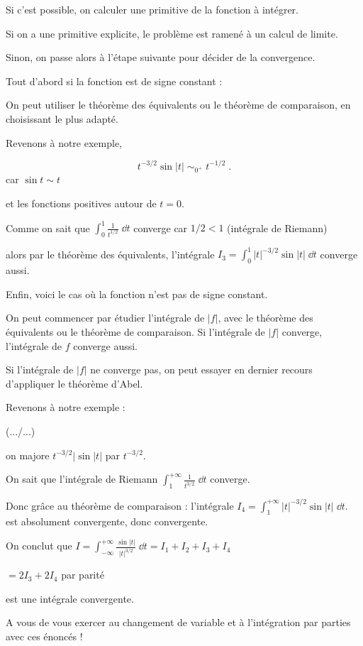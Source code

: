 Si c'est possible, on calculer une primitive de la fonction à intégrer.

Si on a une primitive explicite, le problème est ramené à un calcul 
de limite. 

Sinon,  on passe alors à l'étape suivante pour décider de la convergence.

\change
Tout d'abord si la fonction est de signe constant :

\change
On peut utiliser le théorème des équivalents 
ou le théorème de comparaison, en choisissant le plus adapté.

\change
Revenons à notre exemple, 

\change
$$
t^{-3/2} \sin |t|  \;\mathop{\sim}_{0^+}\; t^{-1/2}\;.
$$
car $\sin t \sim t$

et les fonctions positives autour de $t=0$.

\change
Comme on sait que $\int_0^1 \frac{1}{t^{1/2}}\;\dd t$ converge
car $1/2 < 1$
(intégrale de Riemann)

\change
alors par le théorème des équivalents,
l'intégrale $I_3 = \int_{0}^{1} |t|^{-3/2} \sin |t| \;\dd t$ 
converge aussi.

\change 
Enfin, voici le cas où la fonction n'est pas de signe constant.

\change
On peut commencer par étudier l'intégrale de $|f|$, 
avec le théorème des équivalents ou le théorème de comparaison. 
Si l'intégrale de $|f|$ converge,  l'intégrale de $f$ converge aussi.


\change
Si l'intégrale de $|f|$ ne converge pas,
on peut essayer en dernier recours d'appliquer le théorème d'Abel. 

\change
Revenons à notre exemple : 

(.../...) 

\change
on majore $t^{-3/2} \big|\sin |t|$ par $t^{-3/2}$.

\change
On sait que l'intégrale de Riemann 
$\int_1^{+\infty} \frac{1}{t^{3/2}}\;\dd t$ converge.

\change
Donc grâce au théorème de comparaison :
l'intégrale $I_4=\int_{1}^{+\infty} |t|^{-3/2} \sin |t| \;\dd t.$ 
est absolument convergente,  donc convergente.

\change
On conclut que
$I = \int_{-\infty}^{+\infty} \frac{\sin |t|}{|t|^{3/2}}\;\dd t
=  I_1+I_2+I_3+I_4$

$= 2 I_3 + 2 I_4$ par parité 

est une intégrale convergente.


 

 \diapo

 A vous de vous exercer au changement de variable 
 et à l'intégration par parties avec ces énoncés !


